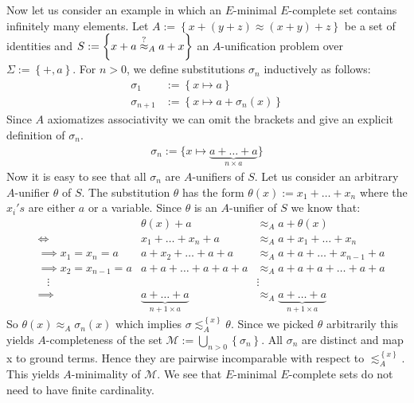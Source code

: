 Now let us consider an example in which an $E$-minimal $E$-complete set contains infinitely many elements. Let $A:=\left\lbrace x+(y+z)\approx (x+y)+z\right\rbrace $ be a set of identities and $S:=\left\lbrace x+a\stackrel{?}{\approx}_A a+x\right\rbrace$ an $A$-unification problem over $\Sigma:=\left\lbrace +,a\right\rbrace$. For $n>0$, we define substitutions $\sigma_n$ inductively as follows:
\begin{align*}
	\sigma_1     & :=\left\lbrace x\mapsto a\right\rbrace             \\
	\sigma_{n+1} & :=\left\lbrace x\mapsto a+\sigma_n(x)\right\rbrace 
\end{align*}
Since $A$ axiomatizes associativity we can omit the brackets and give an explicit definition of $\sigma_n$.
\begin{align*}
	\sigma_n:=\lbrace x\mapsto\underbrace{a+\dots+a}_{n\times a} \rbrace 
\end{align*}
Now it is easy to see that all $\sigma_n$ are $A$-unifiers of $S$.
Let us consider an arbitrary $A$-unifier $\theta$ of $S$. The substitution $\theta$ has the form $\theta(x):=x_1+\dots+x_n$ where the $x_i's$ are either $a$ or a variable.
Since $\theta$ is an $A$-unifier of $S$ we know that:
\begin{align*}
	  &                          & \theta(x)+a                          & \approx_A a+\theta(x)                          \\
	  & \iff                         & x_1+\dots+x_n+a                      & \approx_A a+x_1+\dots+x_n                      \\
	  & \implies x_1=x_n=a     & a+x_2+\dots+a+a              & \approx_A a+a+\dots+x_{n-1}+a              \\
	  & \implies x_2=x_{n-1}=a & a+a+\dots+a+a+a                      & \approx_A a+a+a+\dots+a+a                      \\
	  & \hspace{10pt}\vdots      &                                      & \vdots                                         \\
	  & \implies                 & \underbrace{a+\dots+a}_{n+1\times a} & \approx_A \underbrace{a+\dots+a}_{n+1\times a} 
\end{align*}
So $\theta(x)\approx_A\sigma_n(x)$ which implies $\sigma\lesssim^{\left\lbrace x\right\rbrace }_A\theta$.
Since we picked $\theta$ arbitrarily this yields $A$-completeness of the set $\mathcal{M}:=\bigcup_{n>0}\left\lbrace  \sigma_n\right\rbrace $.
All $\sigma_n$ are distinct and map x to ground terms. Hence they are pairwise incomparable with respect to $\lesssim^{\left\lbrace x\right\rbrace }_A$. This yields $A$-minimality of $\mathcal{M}$.
We see that $E$-minimal $E$-complete sets do not need to have finite cardinality.

